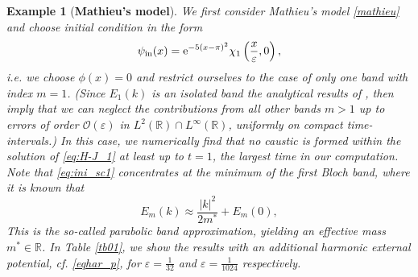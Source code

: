 \documentclass[leqno,final]{siamltex}
\makeatletter
\newtheorem{example}{Example}[section]
{\catcode `\@=11 \global\let\AddToReset=\@addtoreset}
\numberwithin{equation}{section}
\newcounter{me}
\makeatother
\begin{document}
\begin{example}[\textbf{Mathieu's model}]\label{nuscex1}
We first consider Mathieu's model \eqref{mathieu} and choose
initial condition in the form \begin{equation}\label{eq:ini_sc1}
\begin{aligned}
\psi_{\rm in}(x)=
{\mathrm{e}}^{-5(x-\pi)^2}\chi_{1}\left(\frac{x}{{\varepsilon }},0\right),
\end{aligned}
\end{equation} {{\sl i.e.\/ }} we choose $\phi(x)=0$ and restrict ourselves to the case
of only one band with index $m=1$. (Since $E_1(k)$ is an isolated
band the analytical results of \cite{BLP, CMS, GRT}, then imply
that we can neglect the contributions from all other bands $m >1$
up to errors of order ${\mathcal O}({{\varepsilon }})$ in $L^2({{\mathbb R}})\cap L^\infty({{\mathbb R}})$,
uniformly on compact time-intervals.) In this case, we numerically
find that no caustic is formed within the solution of
\eqref{eq:H-J_1} at least up to $t=1$, the largest time in our
computation. Note that \eqref{eq:ini_sc1} concentrates at the
minimum of the first Bloch band, where it is known that \begin{equation}
E_m(k)\approx \frac{|k|^2}{2m^*} + E_m(0), \end{equation} This is the
so-called \emph{parabolic band approximation}, yielding an
effective mass $m^* \in {{\mathbb R}}$. In Table
\ref{tb01}, 
we show the results with an additional harmonic external
potential, {{\sl cf.\/ }} \eqref{eqhar_p}, for ${{\varepsilon }}={\frac{{1}}{{32}}}$ and ${{\varepsilon }}=
{\frac{{1}}{{1024}}}$ respectively.
\begin{table}[htbp]
\caption{Difference between the asymptotic solution and the
Schr\"odinger equation for example \ref{nuscex1} (${\triangle} t=10^{-4}$,
${\triangle} x=1/32768$):}\label{tb01}
\begin{center}\footnotesize


\end{center}
\end{table}
\end{example}
\end{document}
